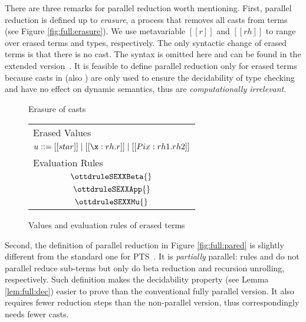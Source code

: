 There are three remarks for parallel reduction worth mentioning.  First,
parallel reduction is defined up to \emph{erasure}, a process that removes
all casts from terms (see Figure \ref{fig:full:erasure}). We use
metavariable $[[r]]$ and $[[rh]]$ to range over erased terms and
types, respectively.
The only syntactic change of erased terms is that there is no
cast. The syntax is omitted here and can be found in
the extended version~\cite{full}. It is feasible to define
parallel reduction only for erased terms because casts in \namef
(also \ecore) are only used to ensure the
decidability of type checking and have no effect on dynamic semantics,
thus are \emph{computationally irrelevant}.

\begin{figure}[t]
\centering
\begin{minipage}[b]{.37\textwidth}
\centering
\begin{small}
\eradef
\end{small}
\caption{Erasure of casts}
\label{fig:full:erasure}
\end{minipage}
\begin{minipage}[b]{.6\textwidth}
\centering
\begin{small}
\renewcommand{\ottdrule}[4][]{{\inferrule{#2 }{#3}}}
\renewcommand{\ottusedrule}[1]{\multicolumn{1}{c}{$#1$}}
\begin{tabular}{l}
Erased Values \\
$u ::= [[star]] \mid [[\x :rh.r]] \mid
                [[Pi x:rh1.rh2]]$ \\[9pt]
Evaluation Rules \\
\ottusedrule{\ottdruleSEXXBeta{}}\\
\ottusedrule{\ottdruleSEXXApp{}}\\
\ottusedrule{\ottdruleSEXXMu{}}\\
\end{tabular}
\vspace{8pt}
\end{small}
\caption{Values and evaluation rules of erased terms}
\label{fig:full:wred}
\end{minipage}
\end{figure}

Second, the definition of parallel reduction in Figure
\ref{fig:full:pared} is slightly different from the standard one for
PTS~\cite{para}. It is \emph{partially} parallel: rules
 and  do not parallel reduce
sub-terms but only do beta reduction and recursion unrolling,
respectively. Such definition makes the decidability property (see
Lemma \ref{lem:full:dec}) easier to prove than the conventional fully
parallel version. It also requires fewer reduction steps than the
non-parallel version, thus correspondingly needs fewer casts.

